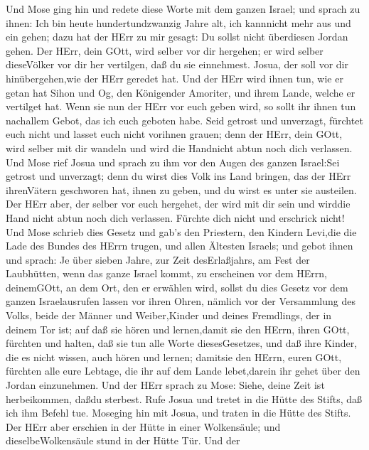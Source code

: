  Und Mose ging hin und redete diese Worte mit dem ganzen
Israel;  und sprach zu ihnen: Ich bin heute
hundertundzwanzig Jahre alt, ich kannnicht mehr aus und ein gehen; dazu
hat der HErr zu mir gesagt: Du sollst nicht überdiesen Jordan gehen.
 Der HErr, dein GOtt, wird selber vor dir hergehen; er wird
selber dieseVölker vor dir her vertilgen, daß du sie einnehmest. Josua,
der soll vor dir hinübergehen,wie der HErr geredet hat.  Und
der HErr wird ihnen tun, wie er getan hat Sihon und Og, den Königender
Amoriter, und ihrem Lande, welche er vertilget hat.  Wenn
sie nun der HErr vor euch geben wird, so sollt ihr ihnen tun nachallem
Gebot, das ich euch geboten habe.  Seid getrost und
unverzagt, fürchtet euch nicht und lasset euch nicht vorihnen grauen;
denn der HErr, dein GOtt, wird selber mit dir wandeln und wird die
Handnicht abtun noch dich verlassen.  Und Mose rief Josua
und sprach zu ihm vor den Augen des ganzen Israel:Sei getrost und
unverzagt; denn du wirst dies Volk ins Land bringen, das der HErr
ihrenVätern geschworen hat, ihnen zu geben, und du wirst es unter sie
austeilen.  Der HErr aber, der selber vor euch hergehet, der
wird mit dir sein und wirddie Hand nicht abtun noch dich verlassen.
Fürchte dich nicht und erschrick nicht!  Und Mose schrieb
dies Gesetz und gab's den Priestern, den Kindern Levi,die die Lade des
Bundes des HErrn trugen, und allen Ältesten Israels;  und
gebot ihnen und sprach: Je über sieben Jahre, zur Zeit desErlaßjahrs, am
Fest der Laubhütten,  wenn das ganze Israel kommt, zu
erscheinen vor dem HErrn, deinemGOtt, an dem Ort, den er erwählen wird,
sollst du dies Gesetz vor dem ganzen Israelausrufen lassen vor ihren
Ohren,  nämlich vor der Versammlung des Volks, beide der
Männer und Weiber,Kinder und deines Fremdlings, der in deinem Tor ist;
auf daß sie hören und lernen,damit sie den HErrn, ihren GOtt, fürchten
und halten, daß sie tun alle Worte diesesGesetzes,  und daß
ihre Kinder, die es nicht wissen, auch hören und lernen; damitsie den
HErrn, euren GOtt, fürchten alle eure Lebtage, die ihr auf dem Lande
lebet,darein ihr gehet über den Jordan einzunehmen.  Und
der HErr sprach zu Mose: Siehe, deine Zeit ist herbeikommen, daßdu
sterbest. Rufe Josua und tretet in die Hütte des Stifts, daß ich ihm
Befehl tue. Moseging hin mit Josua, und traten in die Hütte des Stifts.
 Der HErr aber erschien in der Hütte in einer Wolkensäule;
und dieselbeWolkensäule stund in der Hütte Tür.  Und der

